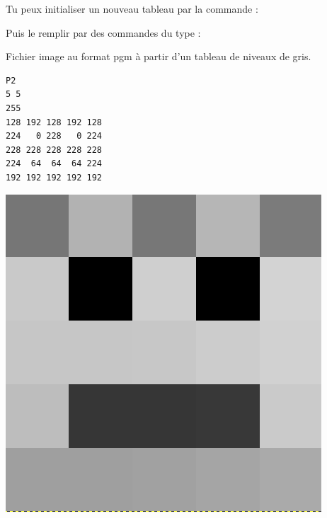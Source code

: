 \documentclass[12pt,class=report,crop=false]{standalone}
\begin{document}
\newpage

Tu peux initialiser un nouveau tableau par la commande :\\
  \centerline{}
  
 Puis le remplir par des commandes du type :\\
  \centerline{}


\newpage


Fichier image au format \og{}pgm\fg{} à partir d'un tableau de niveaux de gris.
  
\begin{center}
\begin{minipage}{0.3\textwidth}
\begin{lstlisting}
P2
5 5
255
128 192 128 192 128
224   0 228   0 224
228 228 228 228 228 
224  64  64  64 224 
192 192 192 192 192 
\end{lstlisting}
\end{minipage}
\begin{minipage}{0.3\textwidth}
\begin{center}
\includegraphics[scale=0.15]{input/ecran-test-pgm}
\end{center}
\end{minipage}
\end{center}
  
 
 
\end{document}
